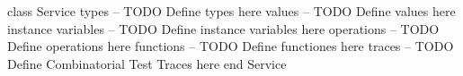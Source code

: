 \begin{vdmpp}[breaklines=true]
class Service
types
-- TODO Define types here
values
-- TODO Define values here
instance variables
-- TODO Define instance variables here
operations
-- TODO Define operations here
functions
-- TODO Define functiones here
traces
-- TODO Define Combinatorial Test Traces here
end Service
\end{vdmpp}
